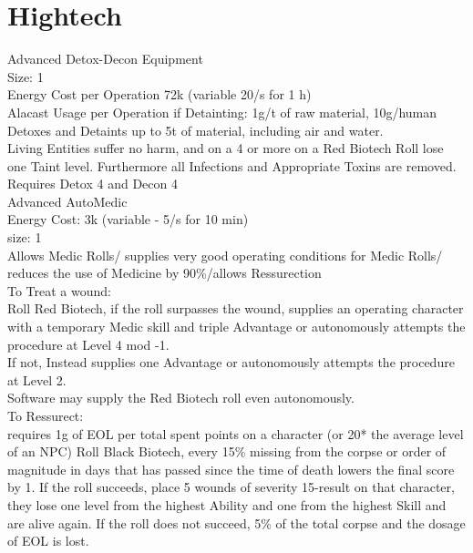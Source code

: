 \section{Hightech}\label{sec:hightech}
Advanced Detox-Decon Equipment \\
Size: 1\\
Energy Cost per Operation 72k (variable 20/s for 1 h)\\
Alacast Usage per Operation if Detainting: 1g/t of raw material, 10g/human\\
Detoxes and Detaints up to 5t of material, including air and water.\\
Living Entities suffer no harm, and on a 4 or more on a Red Biotech Roll lose one Taint level.
Furthermore all Infections and Appropriate Toxins are removed.\\
Requires Detox 4 and Decon 4\\
\newline
Advanced AutoMedic\\
Energy Cost: 3k (variable - 5/s for 10 min)\\
size: 1\\
Allows Medic Rolls/ supplies very good operating conditions for Medic Rolls/ reduces the use of Medicine by 90\%/allows Ressurection\\
To Treat a wound:\\
Roll Red Biotech, if the roll surpasses the wound, supplies an operating character with a temporary Medic skill and
triple Advantage or autonomously attempts the procedure at Level 4 mod -1.\\
If not, Instead supplies one Advantage or autonomously attempts the procedure at Level 2.\\
Software may supply the Red Biotech roll even autonomously.\\
To Ressurect:\\
requires 1g of EOL per total spent points on a character (or 20* the average level of an NPC)
Roll Black Biotech, every 15\% missing from the corpse or order of magnitude in days that has passed since the time of death
lowers the final score by 1.
If the roll succeeds, place 5 wounds of severity 15-result on that character, they lose
one level from the highest Ability and one from the highest Skill and are alive again.
If the roll does not succeed,
5\% of the total corpse and the dosage of EOL is lost.

\fi